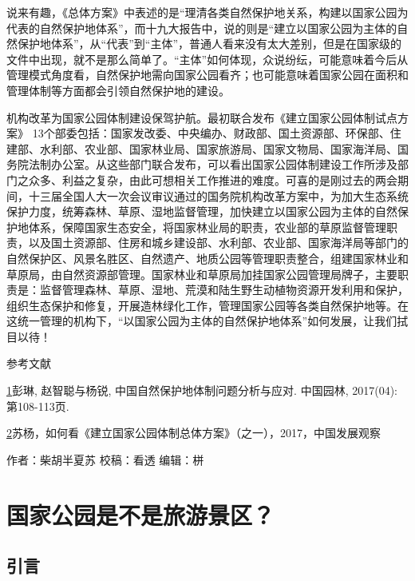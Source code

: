 \documentclass[
]{book}
\begin{document}
说来有趣，《总体方案》中表述的是``理清各类自然保护地关系，构建以国家公园为代表的自然保护地体系''，而十九大报告中，说的则是``建立以国家公园为主体的自然保护地体系''，从``代表''到``主体''，普通人看来没有太大差别，但是在国家级的文件中出现，就不是那么简单了。``主体''如何体现，众说纷纭，可能意味着今后从管理模式角度看，自然保护地需向国家公园看齐；也可能意味着国家公园在面积和管理体制等方面都会引领自然保护地的建设。

机构改革为国家公园体制建设保驾护航。最初联合发布《建立国家公园体制试点方案》 13个部委包括：国家发改委、中央编办、财政部、国土资源部、环保部、住建部、水利部、农业部、国家林业局、国家旅游局、国家文物局、国家海洋局、国务院法制办公室。从这些部门联合发布，可以看出国家公园体制建设工作所涉及部门之众多、利益之复杂，由此可想相关工作推进的难度。可喜的是刚过去的两会期间，十三届全国人大一次会议审议通过的国务院机构改革方案中，为加大生态系统保护力度，统筹森林、草原、湿地监督管理，加快建立以国家公园为主体的自然保护地体系，保障国家生态安全，将国家林业局的职责，农业部的草原监督管理职责，以及国土资源部、住房和城乡建设部、水利部、农业部、国家海洋局等部门的自然保护区、风景名胜区、自然遗产、地质公园等管理职责整合，组建国家林业和草原局，由自然资源部管理。国家林业和草原局加挂国家公园管理局牌子，主要职责是：监督管理森林、草原、湿地、荒漠和陆生野生动植物资源开发利用和保护，组织生态保护和修复，开展造林绿化工作，管理国家公园等各类自然保护地等。在这统一管理的机构下，``以国家公园为主体的自然保护地体系''如何发展，让我们拭目以待！

参考文献

\href{陈心想，耿增超。西北农林科技大学学报（自然科学版），2013，41:\%20167-174．}{1}彭琳, 赵智聪与杨锐, 中国自然保护地体制问题分析与应对. 中国园林, 2017(04): 第108-113页.

\href{Kezhen\%20Qian,\%20Ajay\%20Kumar,\%20et.al.\%20Renew.\%20and\%20Sustain.\%20Energy\%20Reviews,\%202015,\%2042:\%201055-1064.}{2}苏杨，如何看《建立国家公园体制总体方案》（之一），2017，中国发展观察

作者：柴胡半夏苏
校稿：看透
编辑：栟

\hypertarget{ux56fdux5bb6ux516cux56edux662fux4e0dux662fux65c5ux6e38ux666fux533a}{%
\section{国家公园是不是旅游景区？}\label{ux56fdux5bb6ux516cux56edux662fux4e0dux662fux65c5ux6e38ux666fux533a}}

\hypertarget{ux5f15ux8a00}{%
\subsection{引言}\label{ux5f15ux8a00}}
\end{document}

